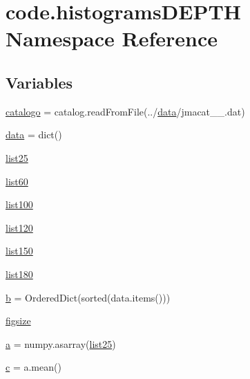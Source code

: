 \hypertarget{namespacecode_1_1histograms_d_e_p_t_h}{}\section{code.\+histograms\+D\+E\+P\+TH Namespace Reference}
\label{namespacecode_1_1histograms_d_e_p_t_h}
\subsection*{Variables}
\begin{DoxyCompactItemize}
\item 
\hyperlink{namespacecode_1_1histograms_d_e_p_t_h_ac0e08ca356707532e7cb0510bf0bbd99}{catalogo} = catalog.\+read\+From\+File(\textquotesingle{}../\hyperlink{namespacecode_1_1histograms_d_e_p_t_h_ae728d672f454a6d8bd3e6224909d089d}{data}/jmacat\+\_\+\_.\+dat\textquotesingle{})
\item 
\hyperlink{namespacecode_1_1histograms_d_e_p_t_h_ae728d672f454a6d8bd3e6224909d089d}{data} = dict()
\item 
\hyperlink{namespacecode_1_1histograms_d_e_p_t_h_a077512d386e3da3f2d6a4205ce0e2cf9}{list25}
\item 
\hyperlink{namespacecode_1_1histograms_d_e_p_t_h_adc29415853fd9d8e698ae39cba0ba81c}{list60}
\item 
\hyperlink{namespacecode_1_1histograms_d_e_p_t_h_af307ca6644f2cfc2fffd077b4ed3a188}{list100}
\item 
\hyperlink{namespacecode_1_1histograms_d_e_p_t_h_a45e7f18be4c4ada37d5c91abf4d398e3}{list120}
\item 
\hyperlink{namespacecode_1_1histograms_d_e_p_t_h_a80485cdf894585ab8bbf892218522e35}{list150}
\item 
\hyperlink{namespacecode_1_1histograms_d_e_p_t_h_a522aa365dbe67528d82f31fcf8ca15ed}{list180}
\item 
\hyperlink{namespacecode_1_1histograms_d_e_p_t_h_a9b2fa78bf8b2a2d6c4793c6f80bcc73c}{b} = Ordered\+Dict(sorted(data.\+items()))
\item 
\hyperlink{namespacecode_1_1histograms_d_e_p_t_h_ad3bd9673f00cc394be25f6f4f240239e}{figsize}
\item 
\hyperlink{namespacecode_1_1histograms_d_e_p_t_h_a53564e2242bbd6af5ab35d2f17862592}{a} = numpy.\+asarray(\hyperlink{namespacecode_1_1histograms_d_e_p_t_h_a077512d386e3da3f2d6a4205ce0e2cf9}{list25})
\item 
\hyperlink{namespacecode_1_1histograms_d_e_p_t_h_ad59909474bef6c83221168a0234e2002}{c} = a.\+mean()

\end{DoxyCompactItemize}
